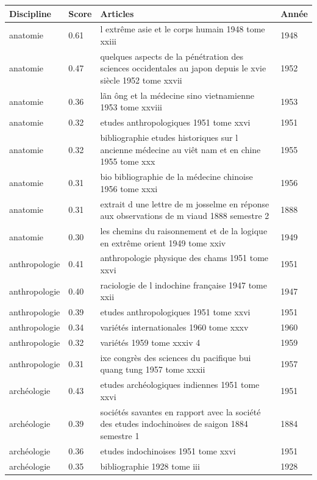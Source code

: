 \begin{longtable}{|p{3cm}|p{1cm}|p{10cm}|p{1cm}|}
\hline
Discipline & Score & Articles & Année\\
\hline
anatomie & 0.61 & l extrême asie et le corps humain 1948 tome xxiii & 1948  \\ \hline
anatomie & 0.47 & quelques aspects de la pénétration des sciences occidentales au japon depuis le xvie siècle 1952 tome xxvii & 1952  \\ \hline
anatomie & 0.36 & lãn ông et la médecine sino vietnamienne 1953 tome xxviii & 1953  \\ \hline
anatomie & 0.32 & etudes anthropologiques 1951 tome xxvi & 1951  \\ \hline
anatomie & 0.32 & bibliographie etudes historiques sur l ancienne médecine au viêt nam et en chine 1955 tome xxx & 1955  \\ \hline
anatomie & 0.31 & bio bibliographie de la médecine chinoise 1956 tome xxxi & 1956  \\ \hline
anatomie & 0.31 & extrait d une lettre de m josselme en réponse aux observations de m viaud 1888 semestre 2 & 1888  \\ \hline
anatomie & 0.30 & les chemins du raisonnement et de la logique en extrême orient 1949 tome xxiv & 1949  \\ \hline
anthropologie & 0.41 & anthropologie physique des chams 1951 tome xxvi & 1951  \\ \hline
anthropologie & 0.40 & raciologie de l indochine française 1947 tome xxii & 1947  \\ \hline
anthropologie & 0.39 & etudes anthropologiques 1951 tome xxvi & 1951  \\ \hline
anthropologie & 0.34 & variétés internationales 1960 tome xxxv & 1960  \\ \hline
anthropologie & 0.32 & variétés 1959 tome xxxiv 4 & 1959  \\ \hline
anthropologie & 0.31 & ixe congrès des sciences du pacifique bui quang tung 1957 tome xxxii & 1957  \\ \hline
archéologie & 0.43 & etudes archéologiques indiennes 1951 tome xxvi & 1951  \\ \hline
archéologie & 0.39 & sociétés savantes en rapport avec la société des etudes indochinoises de saigon 1884 semestre 1 & 1884  \\ \hline
archéologie & 0.36 & etudes indochinoises 1951 tome xxvi & 1951  \\ \hline
archéologie & 0.35 & bibliographie 1928 tome iii & 1928  \\ \hline

\end{longtable}

